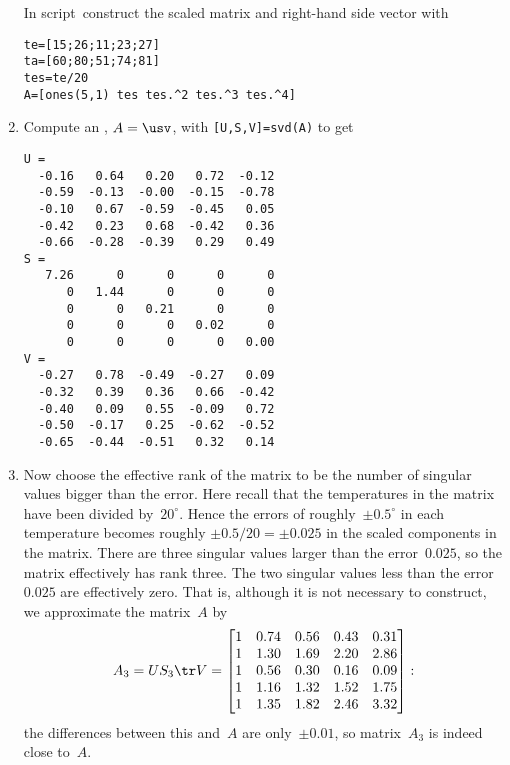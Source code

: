 \begin{example}
\begin{solution}
\begin{enumerate}
In script\ construct the scaled matrix and right-hand side vector with 
\begin{verbatim}
te=[15;26;11;23;27]
ta=[60;80;51;74;81]
tes=te/20
A=[ones(5,1) tes tes.^2 tes.^3 tes.^4]
\end{verbatim}
\setbox\ajrqrbox\hbox{}%
\marginpar{\usebox{\ajrqrbox\\[2ex]}}%

\item Compute an \svd, \(A=\usv\), with \verb|[U,S,V]=svd(A)| to get \twodp
\begin{verbatim}
U =
  -0.16   0.64   0.20   0.72  -0.12
  -0.59  -0.13  -0.00  -0.15  -0.78
  -0.10   0.67  -0.59  -0.45   0.05
  -0.42   0.23   0.68  -0.42   0.36
  -0.66  -0.28  -0.39   0.29   0.49
S =
   7.26      0      0      0      0
      0   1.44      0      0      0
      0      0   0.21      0      0
      0      0      0   0.02      0
      0      0      0      0   0.00
V =
  -0.27   0.78  -0.49  -0.27   0.09
  -0.32   0.39   0.36   0.66  -0.42
  -0.40   0.09   0.55  -0.09   0.72
  -0.50  -0.17   0.25  -0.62  -0.52
  -0.65  -0.44  -0.51   0.32   0.14
\end{verbatim}

\item Now choose the effective rank of the matrix to be the number of singular values bigger than the error.
Here recall that the temperatures in the matrix have been divided by~\(20^\circ\).
Hence the errors of roughly~\(\pm0.5^\circ\) in each temperature becomes roughly \(\pm0.5/20=\pm0.025\) in the scaled components in the matrix.
There are three singular values larger than the error~\(0.025\), so the matrix effectively has rank three.
The two singular values less than the error~\(0.025\) are effectively zero.
That is, although it is not necessary to construct, we approximate the matrix~\(A\) by \twodp
\begin{equation*}
A_3=US_3\tr V=\begin{bmatrix} 1&0.74&0.56&0.43&0.31
\\1&1.30&1.69&2.20&2.86
\\1&0.56&0.30&0.16&0.09
\\1&1.16&1.32&1.52&1.75
\\1&1.35&1.82&2.46&3.32 \end{bmatrix}:
\end{equation*}
the differences between this and~\(A\) are only~\(\pm0.01\), so matrix~\(A_3\) is indeed close to~\(A\).


\end{enumerate}
\end{solution}
\end{example}
